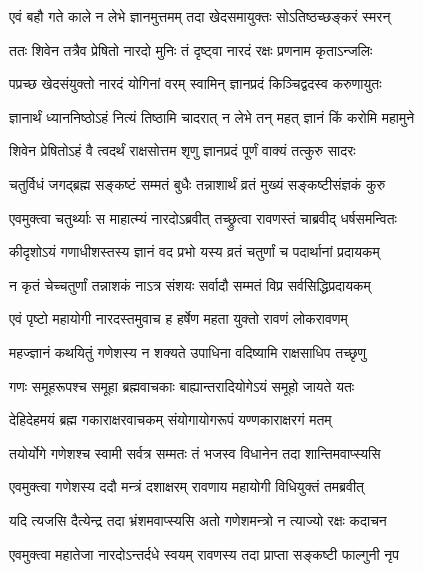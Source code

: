 \twolineshloka
{एवं बहौ गते काले न लेभे ज्ञानमुत्तमम्}
{तदा खेदसमायुक्तः सोऽतिष्ठच्छङ्करं स्मरन्} %

\twolineshloka
{ततः शिवेन तत्रैव प्रेषितो नारदो मुनिः}
{तं दृष्ट्वा नारदं रक्षः प्रणनाम कृताऽन्जलिः} %

\twolineshloka
{पप्रच्छ खेदसंयुक्तो नारदं योगिनां वरम्}
{स्वामिन् ज्ञानप्रदं किञ्चिद्वदस्व करुणायुतः} %

\twolineshloka
{ज्ञानार्थं ध्याननिष्ठोऽहं नित्यं तिष्ठामि चादरात्}
{न लेभे तन् महत् ज्ञानं किं करोमि महामुने} %


\twolineshloka
{शिवेन प्रेषितोऽहं वै त्वदर्थं राक्षसोत्तम}
{श‍ृणु ज्ञानप्रदं पूर्णं वाक्यं तत्कुरु सादरः} %

\twolineshloka
{चतुर्विधं जगद्ब्रह्म सङ्कष्टं सम्मतं बुधैः}
{तन्नाशार्थं व्रतं मुख्यं सङ्कष्टीसंज्ञकं कुरु} %

\twolineshloka
{एवमुक्त्वा चतुर्थ्याः स माहात्म्यं नारदोऽब्रवीत्}
{तच्छ्रुत्वा रावणस्तं चाब्रवीद् धर्षसमन्वितः} %


\twolineshloka
{कीदृशोऽयं गणाधीशस्तस्य ज्ञानं वद प्रभो}
{यस्य व्रतं चतुर्णां च पदार्थानां प्रदायकम्} %

\twolineshloka
{न कृतं चेच्चतुर्णां तन्नाशकं नाऽत्र संशयः}
{सर्वादौ सम्मतं विप्र सर्वसिद्धिप्रदायकम्} %

\twolineshloka
{एवं पृष्टो महायोगी नारदस्तमुवाच ह}
{हर्षेण महता युक्तो रावणं लोकरावणम्} %


\twolineshloka
{महज्ज्ञानं कथयितुं गणेशस्य न शक्यते}
{उपाधिना वदिष्यामि राक्षसाधिप तच्छृणु} %

\twolineshloka
{गणः समूहरूपश्च समूहा ब्रह्मवाचकाः}
{बाह्यान्तरादियोगेऽयं समूहो जायते यतः} %

\twolineshloka
{देहिदेहमयं ब्रह्म गकाराक्षरवाचकम्}
{संयोगायोगरूपं यण्णकाराक्षरगं मतम्} %

\twolineshloka
{तयोर्योगे गणेशश्च स्वामी सर्वत्र सम्मतः}
{तं भजस्व विधानेन तदा शान्तिमवाप्स्यसि} %

\twolineshloka
{एवमुक्त्वा गणेशस्य ददौ मन्त्रं दशाक्षरम्}
{रावणाय महायोगी विधियुक्तं तमब्रवीत्} %

\twolineshloka
{यदि त्यजसि दैत्येन्द्र तदा भ्रंशमवाप्स्यसि}
{अतो गणेशमन्त्रो न त्याज्यो रक्षः कदाचन} %

\twolineshloka
{एवमुक्त्वा महातेजा नारदोऽन्तर्दधे स्वयम्}
{रावणस्य तदा प्राप्ता सङ्कष्टी फाल्गुनी नृप} %


